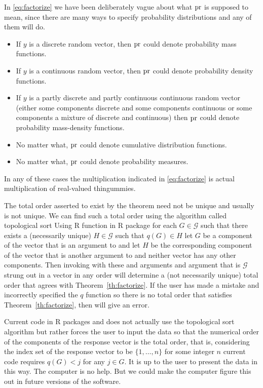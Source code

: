 In \eqref{eq:factorize} we have been deliberately vague about what $\operatorname{pr}$ is
supposed to mean, since there are many ways to specify probability
distributions and any of them will do.
\begin{itemize}
\item If $y$ is a discrete random vector,
      then $\operatorname{pr}$ could denote probability mass functions.
\item If $y$ is a continuous random vector,
      then $\operatorname{pr}$ could denote probability density functions.
\item If $y$ is a partly discrete and partly continuous continuous
      random vector (either some components discrete and some components
      continuous or some components a mixture of discrete and continuous)
      then $\operatorname{pr}$ could denote probability mass-density functions.
\item No matter what, $\operatorname{pr}$ could denote cumulative distribution functions.
\item No matter what, $\operatorname{pr}$ could denote probability measures.
\end{itemize}
In any of these cases the multiplication indicated in \eqref{eq:factorize}
is actual multiplication of real-valued thingummies.

The total order asserted to exist by the theorem need not be unique and
usually is not unique.
We can find such a total order using the algorithm called topological sort
\citep[Section~6.6]{aho-et-al} Using R function  in R package
\citep{pooh-package}
for each $G \in \mathcal{G}$ such that there exists
a (necessarily unique) $H \in \mathcal{G}$ such that $q(G) \in H$
let $G$ be a component of the vector  that is an argument to
 and
let $H$ be the corresponding component of the vector  that is another
argument to  and
neither vector has any other components.  Then invoking  with
these  and  arguments and  argument that is
$\mathcal{G}$ strung out in a vector in any order
will determine a (not necessarily unique) total order that agrees with
Theorem~\ref{th:factorize}.  If the user has made a mistake and incorrectly
specified the $q$ function so there is no total order that satisfies
Theorem~\ref{th:factorize}, then  will give an error.

Current code in R packages  and  does not
actually use the topological sort algorithm but rather forces the user
to input the data so that the numerical order of the components of the
response vector is the total order, that is, considering the index set
of the response vector to be $\{1, \ldots, n\}$ for some integer $n$
current code requires $q(G) < j$ for any $j \in G$.
It is up to the user to present the data in this way.  The computer is no help.
But we could make the computer figure this out in future versions of the
software.

